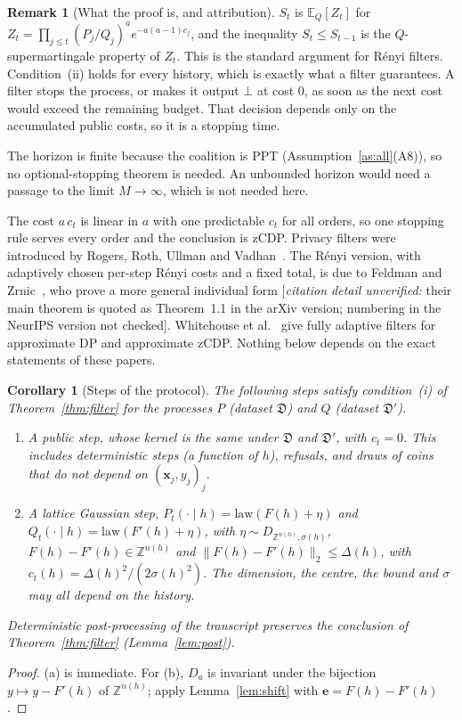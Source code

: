 \documentclass[11pt]{article}
\theoremstyle{definition}
\newtheorem{remark}[definition]{Remark}
\theoremstyle{plain}
\newtheorem{corollary}[definition]{Corollary}
\newcommand{\Z}{\mathbb{Z}}
\newcommand{\Ex}{\mathbb{E}}
\newcommand{\nrm}[1]{\lVert #1\rVert}
\newcommand{\bx}{\mathbf{x}}
\newcommand{\unsure}[1]{\textcolor{orange!75!black}{[\emph{citation detail unverified:} #1]}}
\newcommand{\bD}{\mathfrak D}
\begin{document}
\begin{remark}[What the proof is, and attribution]\label{rem:filterattr}
$S_t$ is $\Ex_Q[Z_t]$ for $Z_t=\prod_{j\le t}(P_j/Q_j)^ae^{-a(a-1)c_j}$, and the inequality $S_t\le S_{t-1}$ is the $Q$-supermartingale property of $Z_t$. This is the standard argument for R\'enyi filters. Condition~(ii) holds for every history, which is exactly what a filter guarantees. A filter stops the process, or makes it output $\bot$ at cost $0$, as soon as the next cost would exceed the remaining budget. That decision depends only on the accumulated public costs, so it is a stopping time.

The horizon is finite because the coalition is PPT (Assumption~\ref{as:all}(A8)), so no optional-stopping theorem is needed. An unbounded horizon would need a passage to the limit $M\to\infty$, which is not needed here.

The cost $a\,c_t$ is linear in $a$ with one predictable $c_t$ for all orders, so one stopping rule serves every order and the conclusion is zCDP. Privacy filters were introduced by Rogers, Roth, Ullman and Vadhan~\cite{RRUV16}. The R\'enyi version, with adaptively chosen per-step R\'enyi costs and a fixed total, is due to Feldman and Zrnic~\cite{FZ21}, who prove a more general individual form \unsure{their main theorem is quoted as Theorem~1.1 in the arXiv version; numbering in the NeurIPS version not checked}. Whitehouse et al.~\cite{WRRW23} give fully adaptive filters for approximate DP and approximate zCDP. Nothing below depends on the exact statements of these papers.
\end{remark}

\begin{corollary}[Steps of the protocol]\label{cor:steps}
The following steps satisfy condition~(i) of Theorem~\ref{thm:filter} for the processes $P$ (dataset $\bD$) and $Q$ (dataset $\bD'$).
\begin{enumerate}[nosep,label=(\alph*)]
  \item A \emph{public step}, whose kernel is the same under $\bD$ and $\bD'$, with $c_t=0$. This includes deterministic steps (a function of $h$), refusals, and draws of coins that do not depend on $(\bx_j,y_j)_j$.
  \item A \emph{lattice Gaussian step}, $P_t(\cdot\mid h)=\mathrm{law}(F(h)+\eta)$ and $Q_t(\cdot\mid h)=\mathrm{law}(F'(h)+\eta)$, with $\eta\sim D_{\Z^{n(h)},\sigma(h)}$, $F(h)-F'(h)\in\Z^{n(h)}$ and $\nrm{F(h)-F'(h)}_2\le\Delta(h)$, with $c_t(h)=\Delta(h)^2/(2\sigma(h)^2)$. The dimension, the centre, the bound and $\sigma$ may all depend on the history.
\end{enumerate}
Deterministic post-processing of the transcript preserves the conclusion of Theorem~\ref{thm:filter} (Lemma~\ref{lem:post}).
\end{corollary}
\begin{proof}
(a) is immediate. For (b), $D_a$ is invariant under the bijection $y\mapsto y-F'(h)$ of $\Z^{n(h)}$; apply Lemma~\ref{lem:shift} with $\mathbf e=F(h)-F'(h)$.
\end{proof}
\end{document}
